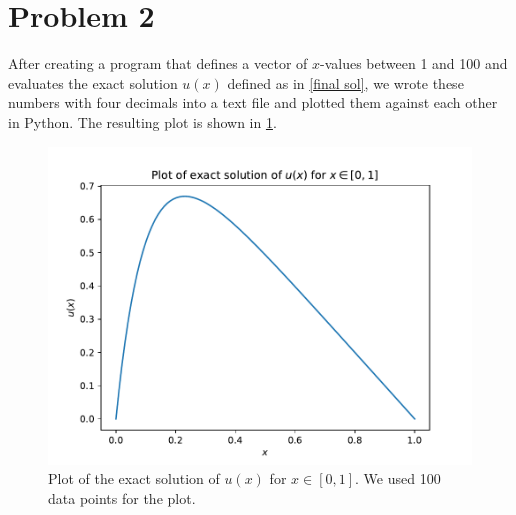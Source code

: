 \documentclass[english,notitlepage]{revtex4-1}  %
\begin{document}
\section*{Problem 2}
After creating a program that defines a vector of $x$-values between 1 and 100 and evaluates the exact solution $u(x)$ defined as in \cref{final sol}, we wrote these numbers with four decimals into a text file and plotted them against each other in Python. The resulting plot is shown in \cref{plot_problem2}.
\begin{figure}[h!]
    \centering 
    \includegraphics[scale=0.80]{plot_problem2.pdf} %
    \caption{Plot of the exact solution of $u(x)$ for $x ∈ [0,1]$. We used 100 data points for the plot.}
    \label{plot_problem2}
\end{figure}
\end{document}
